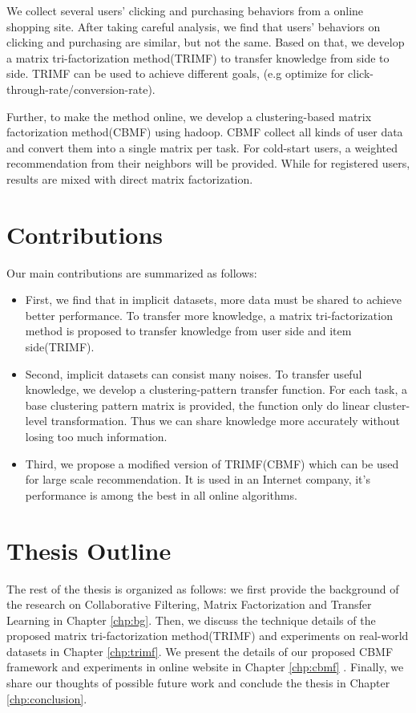 We collect several users' clicking and purchasing behaviors from a online shopping site. After taking careful analysis, we find that users' behaviors on clicking and purchasing are similar, but not the same. Based on that, we develop a matrix tri-factorization method(TRIMF) to transfer knowledge from side to side. TRIMF can be used to achieve different goals, (e.g optimize for click-through-rate/conversion-rate).

Further, to make the method online, we develop a clustering-based matrix factorization method(CBMF) using hadoop. CBMF collect all kinds of user data and convert them into a single matrix per task. For cold-start users, a weighted recommendation from their neighbors will be provided. While for registered users, results are mixed with direct matrix factorization.

\hspace{0.1in}
\section{Contributions}

Our main contributions are summarized as follows:

\begin{itemize}[noitemsep,topsep=0pt,parsep=0pt,partopsep=0pt]
\item First, we find that in implicit datasets, more data must be shared to achieve better performance. To transfer more knowledge, a matrix tri-factorization method is proposed to transfer knowledge from user side and item side(TRIMF).
\item Second, implicit datasets can consist many noises. To transfer useful knowledge, we develop a clustering-pattern transfer function. For each task, a base clustering pattern matrix is provided, the function only do linear cluster-level transformation. Thus we can share knowledge more accurately without losing too much information.
\item Third, we propose a modified version of TRIMF(CBMF) which can be used for large scale recommendation. It is used in an Internet company, it's performance is among the best in all online algorithms.
\end{itemize}

\hspace{0.1in}
\section{Thesis Outline}

The rest of the thesis is organized as follows: we first provide the background of the research on Collaborative Filtering, Matrix Factorization and Transfer Learning in Chapter \ref{chp:bg}. Then, we discuss the technique details of the proposed matrix tri-factorization method(TRIMF) and experiments on real-world datasets in Chapter \ref{chp:trimf}. We present the details of our proposed CBMF framework and experiments in online website in Chapter \ref{chp:cbmf} . Finally, we share our thoughts of possible future work and conclude the thesis in Chapter \ref{chp:conclusion}.



